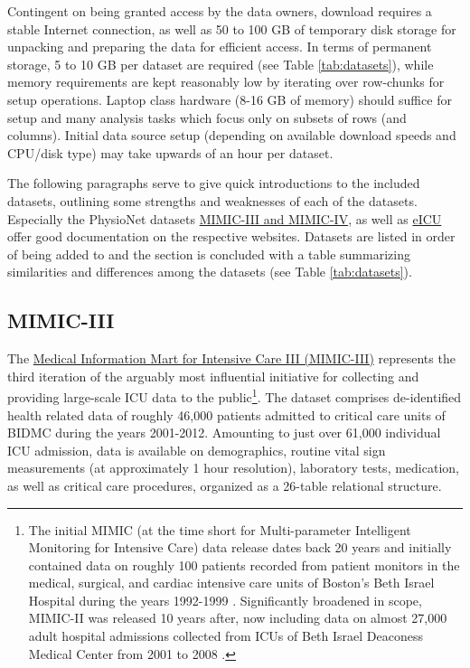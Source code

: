 \documentclass[
  notitle,
  nojss,
  noheadings]{jss}
\begin{document}
Contingent on being granted access by the data owners, download requires
a stable Internet connection, as well as 50 to 100 GB of temporary disk
storage for unpacking and preparing the data for efficient access. In
terms of permanent storage, 5 to 10 GB per dataset are required (see
Table \ref{tab:datasets}), while memory requirements are kept reasonably
low by iterating over row-chunks for setup operations. Laptop class
hardware (8-16 GB of memory) should suffice for setup and many analysis
tasks which focus only on subsets of rows (and columns). Initial data
source setup (depending on available download speeds and CPU/disk type)
may take upwards of an hour per dataset.

The following paragraphs serve to give quick introductions to the
included datasets, outlining some strengths and weaknesses of each of
the datasets. Especially the PhysioNet datasets
\href{https://mimic.mit.edu/docs/}{MIMIC-III and MIMIC-IV}, as well as
\href{https://eicu-crd.mit.edu/about/eicu/}{eICU} offer good
documentation on the respective websites. Datasets are listed in order
of being added to  and the section is concluded with a table
summarizing similarities and differences among the datasets (see Table
\ref{tab:datasets}).

\hypertarget{mimic-iii}{%
\subsection{MIMIC-III}\label{mimic-iii}}

The \href{https://physionet.org/content/mimiciii/1.4/}{Medical
Information Mart for Intensive Care III (MIMIC-III)} represents the
third iteration of the arguably most influential initiative for
collecting and providing large-scale ICU data to the public\footnote{The
  initial MIMIC (at the time short for Multi-parameter Intelligent
  Monitoring for Intensive Care) data release dates back 20 years and
  initially contained data on roughly 100 patients recorded from patient
  monitors in the medical, surgical, and cardiac intensive care units of
  Boston's Beth Israel Hospital during the years 1992-1999
  \citep{moody1996}. Significantly broadened in scope, MIMIC-II was
  released 10 years after, now including data on almost 27,000 adult
  hospital admissions collected from ICUs of Beth Israel Deaconess
  Medical Center from 2001 to 2008 \citep{lee2011}.}. The dataset
comprises de-identified health related data of roughly 46,000 patients
admitted to critical care units of BIDMC during the years 2001-2012.
Amounting to just over 61,000 individual ICU admission, data is
available on demographics, routine vital sign measurements (at
approximately 1 hour resolution), laboratory tests, medication, as well
as critical care procedures, organized as a 26-table relational
structure.
\end{document}
